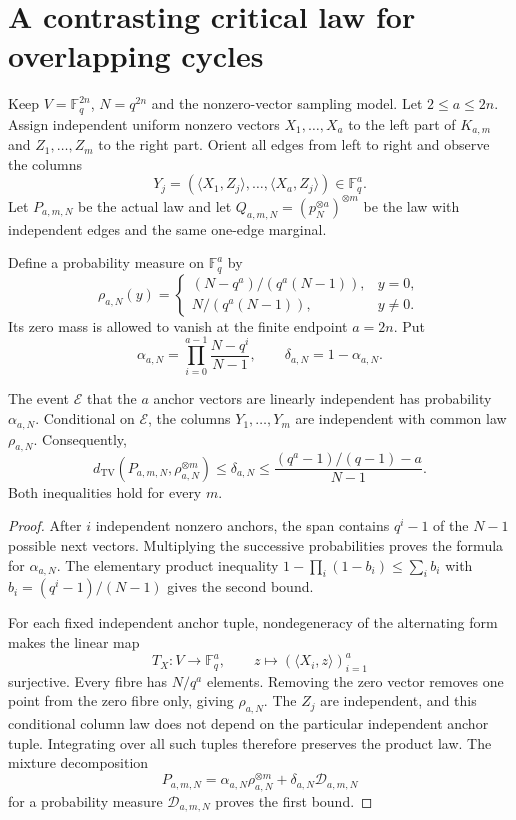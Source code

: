 \section{A contrasting critical law for overlapping cycles}\label{sec:overlap}

Keep $V=\mathbb F_q^{2n}$, $N=q^{2n}$ and the nonzero-vector sampling model.
Let $2\le a\le2n$. Assign independent uniform nonzero vectors
$X_1,\ldots,X_a$ to the left part of $K_{a,m}$ and
$Z_1,\ldots,Z_m$ to the right part. Orient all edges from left to right and
observe the columns
\[
 Y_j=(\langle X_1,Z_j\rangle,\ldots,
       \langle X_a,Z_j\rangle)\in\mathbb F_q^a.
\]
Let $P_{a,m,N}$ be the actual law and let
$Q_{a,m,N}=(p_N^{\otimes a})^{\otimes m}$ be the law with independent
edges and the same one-edge marginal.

Define a probability measure on $\mathbb F_q^a$ by
\[
 \rho_{a,N}(y)=
 \begin{cases}
 (N-q^a)/(q^a(N-1)),&y=0,\\
 N/(q^a(N-1)),&y\ne0.
 \end{cases}
\]
Its zero mass is allowed to vanish at the finite endpoint $a=2n$.
Put
\[
 \alpha_{a,N}=\prod_{i=0}^{a-1}\frac{N-q^i}{N-1},\qquad
 \delta_{a,N}=1-\alpha_{a,N}.
\]

\begin{proposition}\label{prop:anchors}
The event $\mathcal E$ that the $a$ anchor vectors are linearly independent
has probability $\alpha_{a,N}$. Conditional on $\mathcal E$, the columns
$Y_1,\ldots,Y_m$ are independent with common law $\rho_{a,N}$.
Consequently,
\[
 d_{\mathrm{TV}}(P_{a,m,N},\rho_{a,N}^{\otimes m})
 \le\delta_{a,N}
 \le\frac{(q^a-1)/(q-1)-a}{N-1}.
\tag{A1}
\]
Both inequalities hold for every $m$.

\end{proposition}
\begin{proof}
After $i$ independent nonzero anchors, the span contains $q^i-1$ of the
$N-1$ possible next vectors. Multiplying the successive probabilities
proves the formula for $\alpha_{a,N}$. The elementary product inequality
$1-\prod_i(1-b_i)\le\sum_i b_i$ with
$b_i=(q^i-1)/(N-1)$ gives the second bound.

For each fixed independent anchor tuple, nondegeneracy of the alternating
form makes the linear map
\[
 T_X:V\longrightarrow\mathbb F_q^a,
 \qquad z\longmapsto(\langle X_i,z\rangle)_{i=1}^a
\]
surjective. Every fibre has $N/q^a$ elements. Removing the zero vector
removes one point from the zero fibre only, giving $\rho_{a,N}$.
The $Z_j$ are independent, and this conditional column law does not depend
on the particular independent anchor tuple. Integrating over all such
tuples therefore preserves the product law. The mixture decomposition
\[
 P_{a,m,N}=\alpha_{a,N}\rho_{a,N}^{\otimes m}
             +\delta_{a,N}\mathcal D_{a,m,N}
\]
for a probability measure $\mathcal D_{a,m,N}$ proves the first bound.
\end{proof}

